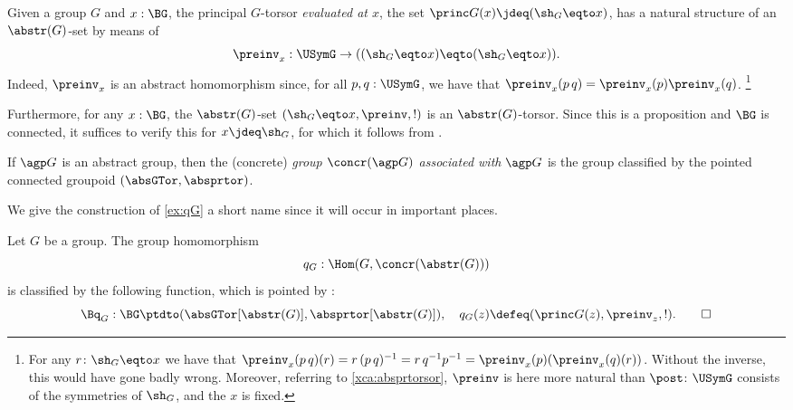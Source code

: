 \begin{example}\label{ex:qG}
  Given a group $G$ and $x:\BG$, the principal $G$-torsor
  \emph{evaluated at $x$}, \ie the set $\princ G(x)\jdeq (\sh_G\eqto x)$,
  has a natural structure of an $\abstr(G)$-set by means of
  $$\preinv_x:\USymG\to ((\sh_G\eqto x)\eqto (\sh_G\eqto x)).$$
  Indeed, $\preinv_x$ is an abstract homomorphism since,
  for all $p,q:\USymG$, we have that 
  $\preinv_x(p\,q)=\preinv_x(p)\preinv_x(q)$.%
  \footnote{For any $r\colon \sh_G\eqto x$ we have that
  $\preinv_x(p\, q)(r)=r\,(p\,q)^{-1}=r\,q^{-1} p^{-1}=
  \preinv_x(p)(\preinv_x(q)(r))$.
  Without the inverse, this would have gone badly wrong.
  Moreover, referring to \cref{xca:absprtorsor},
  $\preinv$ is here more natural than $\post$:
  $\USymG$ consists of the symmetries of $\sh_G$, and the $x$ is fixed.}

  Furthermore, for any $x:\BG$, the $\abstr(G)$-set 
  $(\sh_G\eqto x,\preinv,!)$ is an $\abstr(G)$-torsor.
  Since this is a proposition and $\BG$ is connected, it suffices
  to verify this for $x\jdeq\sh_G$, for which it follows from
  .
\end{example}

\begin{definition}
  If ${\agp G}$ is an abstract group, then the (concrete)
  \emph{group $\concr({\agp G})$ associated with ${\agp G}$} is the group
  classified by the pointed connected groupoid 
  $(\absGTor,\absprtor)$.
\end{definition}

We give the construction of \cref{ex:qG}  a short 
name since it will occur in important places.
\begin{definition}
  Let $G$ be a group.
  The group homomorphism
  $$q_G:\Hom(G,\concr(\abstr(G)))$$
  is classified by the following function, which is pointed by
  :
\[
  \Bq_G:\BG\ptdto (\absGTor[\abstr(G)],\absprtor[\abstr(G)]),\quad q_G(z)
  \defeq(\princ G(z),\preinv_z,!).\qedhere
\]
\end{definition}


{\large {}}

